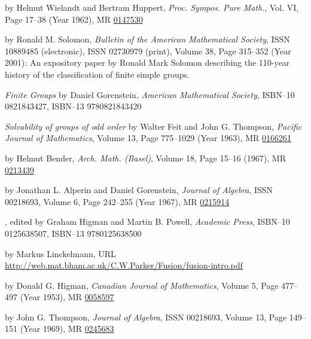 \documentclass{amsart}
\begin{document}
\begin{thebibliography}{99}

 by Helmut Wielandt and Bertram Huppert,
  {\em Proc. Sympos. Pure Math.}, Vol. VI, Page 17--38 (Year 1962), MR
  \href{http://www.ams.org/mathscinet-getitem?mr=0147530}{0147530}

 by Ronald M. Solomon, {\em Bulletin of the
    American Mathematical Society}, ISSN 10889485 (electronic), ISSN
    02730979 (print), Volume 38, Page 315--352 (Year 2001): An
    expository paper by Ronald Mark Solomon describing the 110-year
    history of the classification of finite simple groups.

   {\em Finite Groups} by Daniel Gorenstein, {\em
      American Mathematical Society}, ISBN--10 0821843427, ISBN--13
    9780821843420

 {\em Solvability of groups of odd order} by
  Walter Feit and John G. Thompson, {\em Pacific Journal of
  Mathematics}, Volume 13, Page 775--1029 (Year 1963), MR
  \href{http://www.ams.org/mathscinet-getitem?mr=0166261}{0166261}

 by Helmut Bender,
  {\em Arch. Math. (Basel)}, Volume 18, Page 15--16 (1967), MR
  \href{http://www.ams.org/mathscinet-getitem?mr=0213439}{0213439}

 by
  Jonathan L. Alperin and Daniel Gorenstein, {\em Journal of Algebra},
  ISSN 00218693, Volume 6, Page 242--255 (Year 1967), MR
  \href{http://www.ams.org/mathscinet-getitem?mr=0215914}{0215914}

, edited by Graham Higman and
  Martin B. Powell, {\em Academic Press}, ISBN--10 0125638507,
  ISBN--13 9780125638500

 by Markus
  Linckelmann, URL \url{http://web.mat.bham.ac.uk/C.W.Parker/Fusion/fusion-intro.pdf}

 by Donald
  G. Higman, {\em Canadian Journal of Mathematics}, Volume 5, Page
  477--497 (Year 1953), MR
  \href{http://www.ams.org/mathscinet-getitem?mr=0058597}{0058597}

 by John G. Thompson, {\em Journal of Algebra},
  ISSN 00218693, Volume 13, Page 149--151 (Year 1969), MR
  \href{http://www.ams.org/mathscinet-getitem?mr=0245683}{0245683}

\end{thebibliography}
\end{document}
